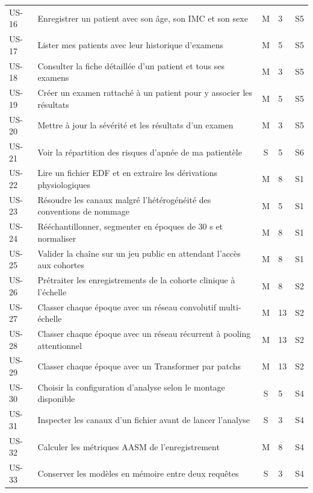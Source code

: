 \begin{longtable}{@{}p{1.25cm}L{9.1cm}cp{0.75cm}p{0.9cm}@{}}
US-16 & Enregistrer un patient avec son âge, son IMC et son sexe & M & 3 & S5 \\
US-17 & Lister mes patients avec leur historique d'examens & M & 5 & S5 \\
US-18 & Consulter la fiche détaillée d'un patient et tous ses examens & M & 3 & S5 \\
US-19 & Créer un examen rattaché à un patient pour y associer les résultats
& M & 5 & S5 \\
US-20 & Mettre à jour la sévérité et les résultats d'un examen & M & 3 & S5 \\
US-21 & Voir la répartition des risques d'apnée de ma patientèle & S & 5 & S6 \\

US-22 & Lire un fichier EDF et en extraire les dérivations physiologiques & M & 8 & S1 \\
US-23 & Résoudre les canaux malgré l'hétérogénéité des conventions de nommage
& M & 5 & S1 \\
US-24 & Rééchantillonner, segmenter en époques de 30 s et normaliser & M & 8 & S1 \\
US-25 & Valider la chaîne sur un jeu public en attendant l'accès aux cohortes
& M & 8 & S1 \\
US-26 & Prétraiter les enregistrements de la cohorte clinique à l'échelle & M & 8 & S2 \\
US-27 & Classer chaque époque avec un réseau convolutif multi-échelle & M & 13 & S2 \\
US-28 & Classer chaque époque avec un réseau récurrent à pooling attentionnel
& M & 13 & S2 \\
US-29 & Classer chaque époque avec un Transformer par patchs & M & 13 & S2 \\
US-30 & Choisir la configuration d'analyse selon le montage disponible & S & 5 & S4 \\
US-31 & Inspecter les canaux d'un fichier avant de lancer l'analyse & S & 3 & S4 \\
US-32 & Calculer les métriques AASM de l'enregistrement & M & 8 & S4 \\
US-33 & Conserver les modèles en mémoire entre deux requêtes & S & 3 & S4 \\


\end{longtable}
